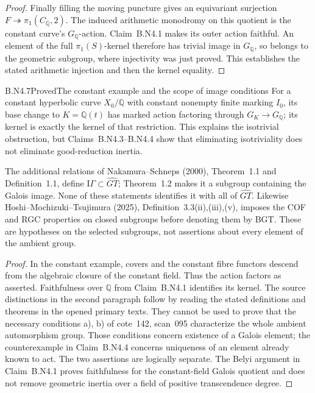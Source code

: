 \begin{proof}
Finally filling the moving puncture gives an equivariant surjection
$F\twoheadrightarrow\pi_1(C_{\overline{\mathbb Q}},2)$.
The induced arithmetic monodromy on this quotient is the constant
curve's $G_{\mathbb Q}$-action.  Claim~B.N4.1 makes its outer action
faithful.  An element of the full $\pi_1(S)$-kernel therefore has
trivial image in $G_{\mathbb Q}$, so belongs to the geometric subgroup,
where injectivity was just proved.  This establishes the stated
arithmetic injection and then the kernel equality.
\end{proof}

\begin{claim}{B.N4.7}{Proved}{The constant example and the scope of image conditions}
For a constant hyperbolic curve $X_0/\mathbb Q$ with constant nonempty
finite marking $I_0$, its base change to $K=\mathbb Q(t)$ has marked
action factoring through $G_K\to G_{\mathbb Q}$; its kernel is exactly
the kernel of that restriction.  This explains the isotrivial
obstruction, but Claims~B.N4.3--B.N4.4 show that eliminating
isotriviality does not eliminate good-reduction inertia.

The additional relations of Nakamura--Schneps (2000), Theorem~1.1 and
Definition~1.1, define $\mathrm I\Gamma\subset\widehat{GT}$;
Theorem~1.2 makes it a subgroup containing the Galois image.  None of
these statements identifies it with all of $\widehat{GT}$.
Likewise Hoshi--Mochizuki--Tsujimura (2025), Definition~3.3(ii),(iii),(v),
imposes the COF and RGC properties on closed subgroups before denoting
them by $\mathrm{BGT}$.  These are hypotheses on the selected subgroups,
not assertions about every element of the ambient group.
\end{claim}
\begin{proof}
In the constant example, covers and the constant fibre functors descend
from the algebraic closure of the constant field.  Thus the action
factors as asserted.  Faithfulness over $\mathbb Q$ from Claim~B.N4.1
identifies its kernel.  The source distinctions in the second paragraph
follow by reading the stated definitions and theorems in the opened
primary texts.  They cannot be used to prove that the necessary
conditions a), b) of cote~142, scan~095 characterize the whole ambient
automorphism group.  Those conditions concern existence of a Galois
element; the counterexample in Claim~B.N4.4 concerns uniqueness of an
element already known to act.  The two assertions are logically
separate.  The Belyi argument in Claim~B.N4.1 proves faithfulness for
the constant-field Galois quotient and does not remove geometric
inertia over a field of positive transcendence degree.
\end{proof}

